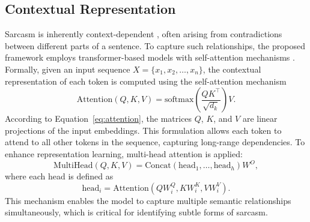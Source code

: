 \documentclass[a4paper,fleqn]{cas-sc}
\begin{document}
\subsection{Contextual Representation}
Sarcasm is inherently context-dependent \citep{ibitoye2025contextual}, often arising from contradictions between different parts of a sentence. To capture such relationships, the proposed framework employs transformer-based models with self-attention mechanisms \citep{wang2025spatial}. Formally, given an input sequence $X = \{x_1, x_2, \ldots, x_n\}$, the contextual representation of each token is computed using the self-attention mechanism
\begin{equation}
\mathrm{Attention}(Q,K,V) = \mathrm{softmax}\!\left(\frac{QK^{\top}}{\sqrt{d_k}}\right)V.
\label{eq:attention}
\end{equation}
According to Equation~\eqref{eq:attention}, the matrices $Q$, $K$, and $V$ are linear projections of the input embeddings. This formulation allows each token to attend to all other tokens in the sequence, capturing long-range dependencies. To enhance representation learning, multi-head attention is applied:
\begin{equation}
\mathrm{MultiHead}(Q,K,V) = \mathrm{Concat}(\mathrm{head}_1,\ldots,\mathrm{head}_h)W^{O},
\label{eq:multihead}
\end{equation}
where each head is defined as
\begin{equation}
\mathrm{head}_i = \mathrm{Attention}(QW_i^{Q}, KW_i^{K}, VW_i^{V}).
\label{eq:head}
\end{equation}
This mechanism enables the model to capture multiple semantic relationships simultaneously, which is critical for identifying subtle forms of sarcasm.
\end{document}
